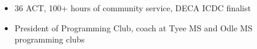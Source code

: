 \documentclass[9pt,a4paper,ragged2e]{altacv}
\begin{document}





\begin{itemize} \itemsep 0pt  %
  \item 36 ACT, 100+ hours of community service, DECA ICDC finalist
  \item President of Programming Club, coach at Tyee MS and Odle MS programming clubs
\end{itemize}

\clearpage

\nocite{*}
\end{document}
